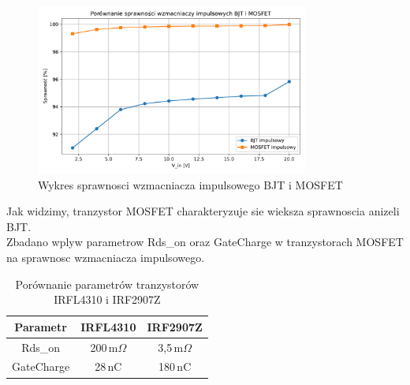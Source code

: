 \documentclass[11pt]{article}
\begin{document}
\begin{figure}[H]
\centering
\includegraphics[width=0.8\textwidth]{aun1_imp_bjt_vs_mosfet.pdf}
\caption{Wykres sprawnosci wzmacniacza impulsowego BJT i MOSFET}
\end{figure}

Jak widzimy, tranzystor MOSFET charakteryzuje sie wieksza sprawnoscia anizeli BJT.\\

Zbadano wplyw parametrow Rds\_on oraz GateCharge w tranzystorach MOSFET
na sprawnosc wzmacniacza impulsowego. \\ 

\begin{table}[H]
\centering
\begin{tabular}{|c|c|c|}
\hline
\textbf{Parametr} & \textbf{IRFL4310} & \textbf{IRF2907Z} \\
\hline
Rds\_on & 200\,m\(\Omega\) & 3,5\,m\(\Omega\) \\
\hline
GateCharge & 28\,nC & 180\,nC \\
\hline
\end{tabular}

\caption{Porównanie parametrów tranzystorów IRFL4310 i IRF2907Z}
\end{table}
\end{document}
